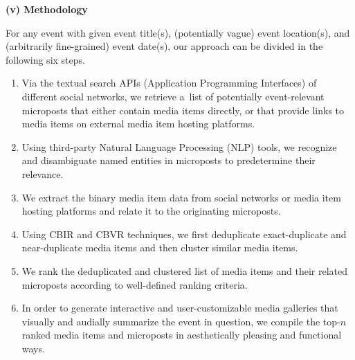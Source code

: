 \begin{abstracts}
\textbf{(v) Methodology}

For any event with given event title(s),
(potentially vague) event location(s), and
(arbitrarily fine-grained) event date(s),
our approach can be divided in the following six steps.

\begin{enumerate}
  \item Via the textual search APIs (Application Programming Interfaces) of
        different social networks,
        we retrieve a~list of potentially event-relevant
        microposts that either contain media items directly,
        or that provide links to media items
        on external media item hosting platforms.
  \item Using third-party
        Natural Language Processing (NLP) tools,
        we recognize and disambiguate named entities
        in microposts to predetermine their relevance.
  \item We extract the binary media item data
        from social networks or media item hosting platforms
        and relate it to the originating microposts.
  \item Using CBIR and CBVR techniques, we first deduplicate
        exact-duplicate and near-duplicate media items
        and then cluster similar media items.
  \item We rank the deduplicated and clustered list
        of media items and their related microposts
        according to well-defined ranking criteria.
  \item In order to generate interactive and user-customizable
        media galleries that visually and audially summarize the
        event in question, we compile the top-$n$ ranked
        media items and microposts in aesthetically pleasing
        and functional ways.
\end{enumerate}
\end{abstracts}
